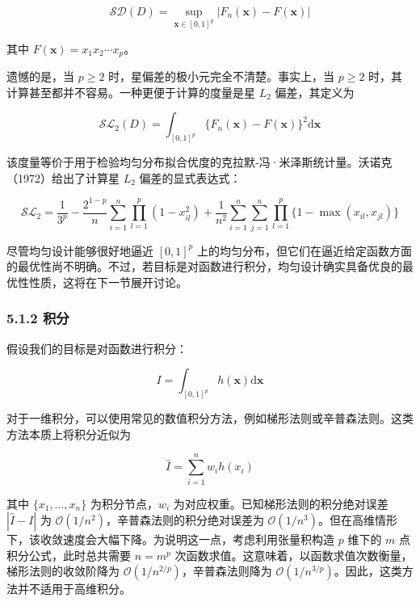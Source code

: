 \documentclass{ctexart}
\begin{document}
\begin{equation*}
\mathcal{S}\mathcal{D}(D)=\sup_{\boldsymbol{x}\in[0,1]^p}|F_n(\boldsymbol{x})-F(\boldsymbol{x})|
\end{equation*}

其中 $F(\boldsymbol{x})=x_1x_2\cdots x_p$。

遗憾的是，当 $p\ge2$ 时，星偏差的极小元完全不清楚。事实上，当 $p\ge2$ 时，其计算甚至都并不容易。一种更便于计算的度量是星 $L_2$ 偏差，其定义为

\begin{equation*}
\mathcal{S}\mathcal{L}_2(D)=\int_{[0,1]^p}\{F_n(\boldsymbol{x})-F(\boldsymbol{x})\}^2\mathrm{d}\boldsymbol{x}
\end{equation*}

该度量等价于用于检验均匀分布拟合优度的克拉默‑冯·米泽斯统计量。沃诺克（1972）给出了计算星 $L_2$ 偏差的显式表达式：

\begin{equation*}
\mathcal{S}\mathcal{L}_2=\frac{1}{3^p}-\frac{2^{1-p}}{n}\sum_{i=1}^n\prod_{l=1}^p\left(1-x_{il}^2\right)+\frac{1}{n^2}\sum_{i=1}^n\sum_{j=1}^n\prod_{l=1}^p\{1-\max(x_{il},x_{jl})\}
\tag{5.2}
\end{equation*}

尽管均匀设计能够很好地逼近 $[0,1]^p$ 上的均匀分布，但它们在逼近给定函数方面的最优性尚不明确。不过，若目标是对函数进行积分，均匀设计确实具备优良的最优性性质，这将在下一节展开讨论。

\subsubsection*{5.1.2 积分}

假设我们的目标是对函数进行积分：

\begin{equation*}
I=\int_{[0,1]^p} h(\boldsymbol{x})\mathrm{d}\boldsymbol{x}
\tag{5.3}
\end{equation*}

对于一维积分，可以使用常见的数值积分方法，例如梯形法则或辛普森法则。这类方法本质上将积分近似为

\begin{equation*}
\widehat{I}=\sum_{i=1}^{n} w_i h(x_i)
\tag{5.4}
\end{equation*}

其中 $\{x_1,\dots,x_n\}$ 为积分节点，$w_i$ 为对应权重。已知梯形法则的积分绝对误差 $|\widehat{I}-I|$ 为 $\mathcal{O}(1/n^2)$，辛普森法则的积分绝对误差为 $\mathcal{O}(1/n^3)$。但在高维情形下，该收敛速度会大幅下降。为说明这一点，考虑利用张量积构造 $p$ 维下的 $m$ 点积分公式，此时总共需要 $n=m^p$ 次函数求值。这意味着，以函数求值次数衡量，梯形法则的收敛阶降为 $\mathcal{O}(1/n^{2/p})$，辛普森法则降为 $\mathcal{O}(1/n^{3/p})$。因此，这类方法并不适用于高维积分。
\end{document}
